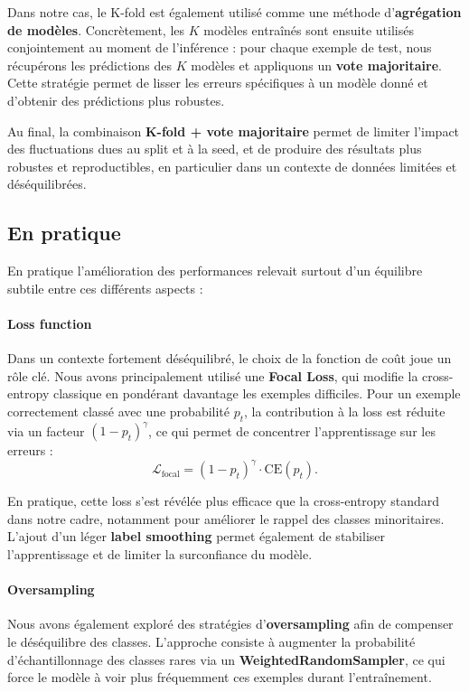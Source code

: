 \documentclass[journal,twocolumn]{IEEEtran}
\begin{document}
Dans notre cas, le K-fold est également utilisé comme une méthode d’\textbf{agrégation de modèles}. Concrètement, les $K$ modèles entraînés sont ensuite utilisés conjointement au moment de l’inférence : pour chaque exemple de test, nous récupérons les prédictions des $K$ modèles et appliquons un \textbf{vote majoritaire}. Cette stratégie permet de lisser les erreurs spécifiques à un modèle donné et d’obtenir des prédictions plus robustes.

Au final, la combinaison \textbf{K-fold + vote majoritaire} permet de limiter l’impact des fluctuations dues au split et à la seed, et de produire des résultats plus robustes et reproductibles, en particulier dans un contexte de données limitées et déséquilibrées.
\subsection{En pratique}

En pratique l'amélioration des performances relevait surtout d'un équilibre subtile entre ces différents aspects :

\paragraph{Loss function}

Dans un contexte fortement déséquilibré, le choix de la fonction de coût joue un rôle clé. Nous avons principalement utilisé une \textbf{Focal Loss}, qui modifie la cross-entropy classique en pondérant davantage les exemples difficiles. Pour un exemple correctement classé avec une probabilité $p_t$, la contribution à la loss est réduite via un facteur $(1 - p_t)^\gamma$, ce qui permet de concentrer l’apprentissage sur les erreurs :
\begin{equation}
\mathcal{L}_{\text{focal}} = (1 - p_t)^\gamma \cdot \text{CE}(p_t).
\end{equation}

En pratique, cette loss s’est révélée plus efficace que la cross-entropy standard dans notre cadre, notamment pour améliorer le rappel des classes minoritaires. L’ajout d’un léger \textbf{label smoothing} permet également de stabiliser l’apprentissage et de limiter la surconfiance du modèle.

\paragraph{Oversampling}

Nous avons également exploré des stratégies d’\textbf{oversampling} afin de compenser le déséquilibre des classes. L’approche consiste à augmenter la probabilité d’échantillonnage des classes rares via un \textbf{WeightedRandomSampler}, ce qui force le modèle à voir plus fréquemment ces exemples durant l’entraînement.
\end{document}
